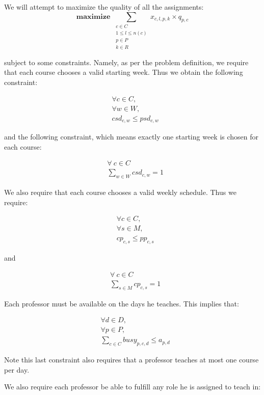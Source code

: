 We will attempt to maximize the quality of all the assignments:
$$
\textbf{maximize } \sum_{\substack{c \in C\\1 \le l \le n(c)\\p \in P\\k \in R}} x_{c, l, p, k} \times q_{p, c}
$$

subject to some constraints. Namely, as per the problem definition, we require that each course chooses a valid starting week. Thus we obtain the following constraint:

\begin{align}
  &\forall c \in C,\\
  &\forall w \in W,\\
  &csd_{c, w} \le psd_{c, w}
\end{align}

and the following constraint, which means exactly one starting week is chosen for each course:

\begin{align} \label{eq:chosenstart}
  &\forall\ c \in C\\
  &\sum_{w \in W} csd_{c, w} = 1
\end{align}

We also require that each course chooses a valid weekly schedule. Thus we require:

\begin{align}
  &\forall c \in C,\\
  &\forall s \in M,\\
  &cp_{c, s} \le pp_{c, s}
\end{align}

and

\begin{align} \label{eq:chosenpattern}
  &\forall\ c \in C\\
  &\sum_{s \in M} cp_{c, s} = 1
\end{align}

Each professor must be available on the days he teaches. This implies that:

\begin{align} \label{eq:availability}
  &\forall d \in D,\\
  &\forall p \in P,\\
  &\sum_{c \in C} busy_{p, c, d} \le a_{p, d}
\end{align}

Note this last constraint also requires that a professor teaches at most one course per day.

We also require each professor be able to fulfill any role he is assigned to teach in:

